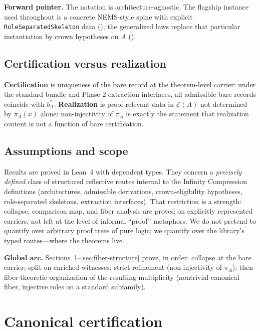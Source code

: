 \documentclass[11pt]{article}
\begin{document}
\smallskip
\noindent\textbf{Forward pointer.} The notation is architecture-agnostic. The flagship instance used throughout is a concrete NEMS-style spine with explicit \texttt{RoleSeparatedSkeleton} data (); the generalized laws replace that particular instantiation by crown hypotheses on $A$ ().

\subsection{Certification versus realization}\label{sec:framework-cert-vs-real}
\textbf{Certification} is uniqueness of the bare record at the theorem-level carrier: under the standard bundle and Phase-2 extraction interfaces, all admissible bare records coincide with $b^\ast_A$. \textbf{Realization} is proof-relevant data in $\mathcal{E}(A)$ not determined by $\pi_A(x)$ alone: non-injectivity of $\pi_A$ is exactly the statement that realization content is not a function of bare certification.

\subsection{Assumptions and scope}\label{sec:framework-assumed}
Results are proved in Lean~4 with dependent types. They concern a \emph{precisely defined} class of structured reflective routes internal to the Infinity Compression definitions (architectures, admissible derivations, crown-eligibility hypotheses, role-separated skeletons, extraction interfaces). That restriction is a strength: collapse, comparison map, and fiber analysis are proved on explicitly represented carriers, not left at the level of informal ``proof'' metaphors. We do not pretend to quantify over arbitrary proof trees of pure logic; we quantify over the library's typed routes---where the theorems live.

\medskip
\noindent\textbf{Global arc.} Sections~\ref{sec:canonical-cert}--\ref{sec:fiber-structure} prove, in order: collapse at the bare carrier; split on enriched witnesses; strict refinement (non-injectivity of $\pi_A$); then fiber-theoretic organization of the resulting multiplicity (nontrivial canonical fiber, injective roles on a standard subfamily).

\section{Canonical certification}\label{sec:canonical-cert}
\end{document}
